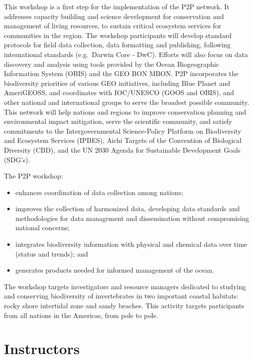 \documentclass[]{book}
\providecommand{\tightlist}{%
  \setlength{\itemsep}{0pt}\setlength{\parskip}{0pt}}
\theoremstyle{definition}
\theoremstyle{definition}
\theoremstyle{definition}
\theoremstyle{remark}
\begin{document}
This workshop is a first step for the implementation of the P2P network.
It addresses capacity building and science development for conservation
and management of living resources, to sustain critical ecosystem
services for communities in the region. The workshop participants will
develop standard protocols for field data collection, data formatting
and publishing, following international standards (e.g.~Darwin Core -
DwC). Efforts will also focus on data discovery and analysis using tools
provided by the Ocean Biogeographic Information System (OBIS) and the
GEO BON MBON. P2P incorporates the biodiversity priorities of various
GEO initiatives, including Blue Planet and AmeriGEOSS, and coordinates
with IOC/UNESCO (GOOS and OBIS), and other national and international
groups to serve the broadest possible community. This network will help
nations and regions to improve conservation planning and environmental
impact mitigation, serve the scientific community, and satisfy
commitments to the Intergovernmental Science-Policy Platform on
Biodiversity and Ecosystem Services (IPBES), Aichi Targets of the
Convention of Biological Diversity (CBD), and the UN 2030 Agenda for
Sustainable Development Goals (SDG's).

The P2P workshop:

\begin{itemize}
\tightlist
\item
  enhances coordination of data collection among nations;
\item
  improves the collection of harmonized data, developing data standards
  and methodologies for data management and dissemination without
  compromising national concerns;
\item
  integrates biodiversity information with physical and chemical data
  over time (status and trends); and
\item
  generates products needed for informed management of the ocean.
\end{itemize}

The workshop targets investigators and resource managers dedicated to
studying and conserving biodiversity of invertebrates in two important
coastal habitats: rocky shore intertidal zone and sandy beaches. This
activity targets participants from all nations in the Americas, from
pole to pole.

\hypertarget{instructors}{%
\section{Instructors}\label{instructors}}
\end{document}
